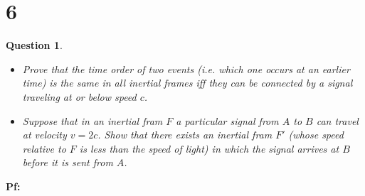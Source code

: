 \documentclass{article}
\newtheorem{question}{Question}
\begin{document}
\break

\section*{6}
\begin{question}\label{q6}

    \hfil

    \begin{itemize}
        \item[(a)] Prove that the time order of two events (i.e. which one occurs at an earlier time) is the same in all inertial frames iff they can be connected by a signal traveling at or below speed $c$.
        \item[(b)] Suppose that in an inertial fram $F$ a particular signal from $A$ to $B$ can travel at velocity $v=2c$. Show that there exists an inertial fram $F'$ (whose speed relative to $F$ is less than the speed of light) in which the signal arrives at $B$ before it is sent from $A$.
    \end{itemize}
\end{question}

\textbf{Pf:}
\end{document}
